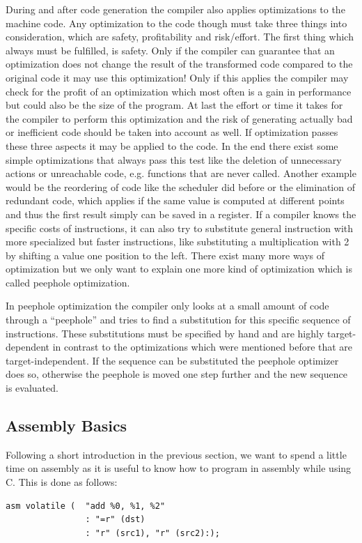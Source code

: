 During and after code generation the compiler also applies optimizations to the machine code.
Any optimization to the code though must take three things into consideration, which are safety, profitability and risk/effort.
The first thing which always must be fulfilled, is safety.
Only if the compiler can guarantee that an optimization does not change the result of the transformed code compared to the original code it may use this optimization!
Only if this applies the compiler may check for the profit of an optimization which most often is a gain in performance but could also be the size of the program.
At last the effort or time it takes for the compiler to perform this optimization and the risk of generating actually bad or inefficient code should be taken into account as well.
If optimization passes these three aspects it may be applied to the code.
In the end there exist some simple optimizations that always pass this test like the deletion of unnecessary actions or unreachable code, e.g. functions that are never called.
Another example would be the reordering of code like the scheduler did before or the elimination of redundant code, which applies if the same value is computed at different points and thus the first result simply can be saved in a register.
If a compiler knows the specific costs of instructions, it can also try to substitute general instruction with more specialized but faster instructions, like substituting a multiplication with 2 by shifting a value one position to the left.
There exist many more ways of optimization but we only want to explain one more kind of optimization which is called peephole optimization.

In peephole optimization the compiler only looks at a small amount of code through a ``peephole'' and tries to find a substitution for this specific sequence of instructions.
These substitutions must be specified by hand and are highly target-dependent in contrast to the optimizations which were mentioned before that are target-independent.
If the sequence can be substituted the peephole optimizer does so, otherwise the peephole is moved one step further and the new sequence is evaluated.

\subsection{Assembly Basics}
\label{section:asm}
Following a short introduction in the previous section, we want to spend a little time on assembly as it is useful to know how to program in assembly while using C.
This is done as follows:
\begin{lstlisting}[caption= Exemplatory Assembly invkation, label=lst:asm]
asm volatile (  "add %0, %1, %2"
                : "=r" (dst)
                : "r" (src1), "r" (src2):);
\end{lstlisting}

